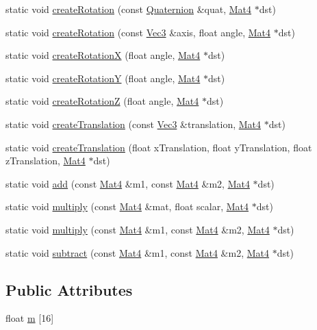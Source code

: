 \begin{DoxyCompactItemize}
\item 
static void \hyperlink{classMat4_a9e95ec184dae30533def5217f8583616}{create\+Rotation} (const \hyperlink{classQuaternion}{Quaternion} \&quat, \hyperlink{classMat4}{Mat4} $\ast$dst)
\item 
static void \hyperlink{classMat4_ae71d2a213bd50059a694d23afd5ae786}{create\+Rotation} (const \hyperlink{classVec3}{Vec3} \&axis, float angle, \hyperlink{classMat4}{Mat4} $\ast$dst)
\item 
static void \hyperlink{classMat4_ada6553ab3869aca6190523862bcbbb98}{create\+RotationX} (float angle, \hyperlink{classMat4}{Mat4} $\ast$dst)
\item 
static void \hyperlink{classMat4_a24d60181510705304b5dffd42fb12b29}{create\+RotationY} (float angle, \hyperlink{classMat4}{Mat4} $\ast$dst)
\item 
static void \hyperlink{classMat4_a4f07014344c83a3d502b5ec7422cd244}{create\+RotationZ} (float angle, \hyperlink{classMat4}{Mat4} $\ast$dst)
\item 
static void \hyperlink{classMat4_a10c09ee857ae1e074f4f66c44e5a477b}{create\+Translation} (const \hyperlink{classVec3}{Vec3} \&translation, \hyperlink{classMat4}{Mat4} $\ast$dst)
\item 
static void \hyperlink{classMat4_aabb5b159d75963284e6fb81b8f464d22}{create\+Translation} (float x\+Translation, float y\+Translation, float z\+Translation, \hyperlink{classMat4}{Mat4} $\ast$dst)
\item 
static void \hyperlink{classMat4_a7a5dae2991b6734daf7f6f7d87831356}{add} (const \hyperlink{classMat4}{Mat4} \&m1, const \hyperlink{classMat4}{Mat4} \&m2, \hyperlink{classMat4}{Mat4} $\ast$dst)
\item 
static void \hyperlink{classMat4_ac146774fcd0217bdeaba90ed2936c3b3}{multiply} (const \hyperlink{classMat4}{Mat4} \&mat, float scalar, \hyperlink{classMat4}{Mat4} $\ast$dst)
\item 
static void \hyperlink{classMat4_ad42e3478d90c75c0b447c72d232d8233}{multiply} (const \hyperlink{classMat4}{Mat4} \&m1, const \hyperlink{classMat4}{Mat4} \&m2, \hyperlink{classMat4}{Mat4} $\ast$dst)
\item 
static void \hyperlink{classMat4_a0f18e64cdea9bffbe5259526481db28e}{subtract} (const \hyperlink{classMat4}{Mat4} \&m1, const \hyperlink{classMat4}{Mat4} \&m2, \hyperlink{classMat4}{Mat4} $\ast$dst)
\end{DoxyCompactItemize}
\subsection*{Public Attributes}
\begin{DoxyCompactItemize}
\item 
float \hyperlink{classMat4_aabd2ecf01c45dbe87060754036a3c763}{m} \mbox{[}16\mbox{]}
\end{DoxyCompactItemize}

